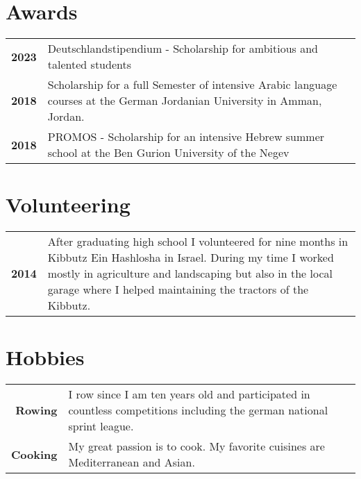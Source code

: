 \documentclass{style/modernsimplecv}
\newlength{\rightcolwidth}
\newlength{\leftcolwidth}
\begin{document}
\begin{paracol}{2}
\begin{minipage}[t]{\rightcolwidth}
    \end{minipage}

    \vspace{3em}

    \begin{minipage}[t]{\leftcolwidth}
        \section*{Awards}
        \begin{tabular}{>{\small\bfseries}r >{\small}p{}}
            2023 & Deutschlandstipendium -  Scholarship for ambitious and talented students                                                  \\
            2018 & Scholarship for a full Semester of intensive Arabic language courses at the German Jordanian University in Amman, Jordan. \\
            2018 & PROMOS -  Scholarship for an intensive Hebrew summer school at the Ben Gurion University of the Negev                     \\
        \end{tabular}
        \bigskip

    \end{minipage}\hfill

    \bigskip

    \begin{minipage}[t]{\rightcolwidth}
        \section*{Volunteering}
        \begin{tabular}{>{\small\bfseries}r >{\small}p{}}
            2014 & After graduating high school I volunteered for nine months in Kibbutz Ein Hashlosha in Israel. During my time I worked mostly in agriculture and landscaping but also in the local garage where I helped maintaining the tractors of the Kibbutz. \\
        \end{tabular}
        \bigskip

        \section*{Hobbies}
        \begin{tabular}{>{\small\bfseries}r >{\small}p{}}
            Rowing  & I row since I am ten years old and participated in countless competitions including the german national sprint league. \\
            Cooking & My great passion is to cook. My favorite cuisines are Mediterranean and Asian.
        \end{tabular}
    \end{minipage}









\end{paracol}
\end{document}
